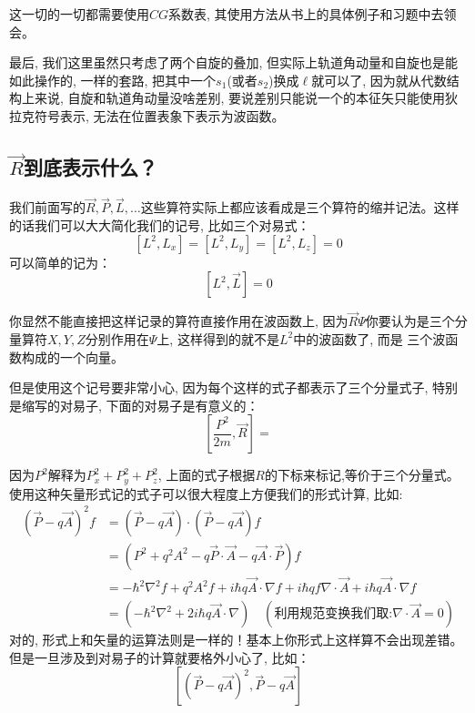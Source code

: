 \documentclass[a4paper,zihao=-4,linespread=1]{ctexrep}
\begin{document}
    这一切的一切都需要使用$CG$系数表, 其使用方法从书上的具体例子和习题中去领会。
    
    最后, 我们这里虽然只考虑了两个自旋的叠加, 但实际上轨道角动量和自旋也是能如此操作的, 一样的套路, 把其中一个$s_1$(或者$s_2$)换成$\ell$就可以了, 因为就从代数结构上来说, 自旋和轨道角动量没啥差别, 
    要说差别只能说一个的本征矢只能使用狄拉克符号表示, 无法在位置表象下表示为波函数。
    
    \newpage
    \subsection*{$\vec{R}$到底表示什么？}
    我们前面写的$\vec{R},\vec{P},\vec{L},\ldots$这些算符实际上都应该看成是三个算符的缩并记法。这样的话我们可以大大简化我们的记号, 比如三个对易式：
    \begin{equation}
        \left[L^2,L_x\right]=\left[L^2,L_y\right]=\left[L^2,L_z\right]=0
    \end{equation}
    可以简单的记为：
    \begin{equation}
        \left[L^2,\vec{L}\right]=0
    \end{equation}

    你显然不能直接把这样记录的算符直接作用在波函数上, 因为$\vec{R}\Psi$你要认为是三个分量算符$X,Y,Z$分别作用在$\Psi$上, 这样得到的就不是$L^2$中的波函数了, 而是
    三个波函数构成的一个向量。
    
    但是使用这个记号要非常小心, 因为每个这样的式子都表示了三个分量式子, 特别是缩写的对易子, 下面的对易子是有意义的：
    \begin{equation}
        \label{eq:4.100}
        \left[\frac{P^2}{2m},\vec{R}\right]=
    \end{equation}
    
    因为$P^2$解释为$P_x^2+P_y^2+P_z^2$, 上面的式子根据$R$的下标来标记,等价于三个分量式。使用这种矢量形式记的式子可以很大程度上方便我们的形式计算, 比如:
    \begin{align*}
        \left(\vec{P}-q\vec{A}\right)^2 f&= \left(\vec{P}-q\vec{A}\right)\cdot\left(\vec{P}-q\vec{A}\right)f\\
        &=\left(P^2+q^2A^2-q\vec{P}\cdot\vec{A}-q\vec{A}\cdot \vec{P}\right)f\\
        &=-\hbar^2\nabla^2 f+q^2A^2f+i\hbar q\vec{A}\cdot\nabla f+i\hbar qf\nabla \cdot\vec{A}+i\hbar q\vec{A}\cdot \nabla f\\
        &=\left(-\hbar^2\nabla^2+2i\hbar q\vec{A}\cdot\nabla\right) \quad (\text{利用规范变换我们取:}\nabla\cdot \vec{A}=0)
    \end{align*}
    对的, 形式上和矢量的运算法则是一样的！基本上你形式上这样算不会出现差错。但是一旦涉及到对易子的计算就要格外小心了, 比如：
    \[
        \left[\left(\vec{P}-q\vec{A}\right)^2,\vec{P}-q\vec{A}\right]
    \]
    
\end{document}
